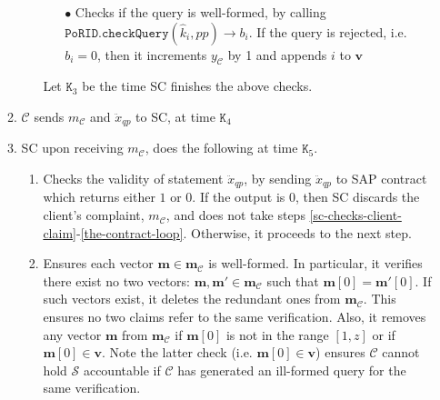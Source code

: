 \begin{enumerate}
\begin{enumerate}
\begin{enumerate}
\begin{itemize}
\item[$\bullet$]Checks if  the query is well-formed, by calling $\mathtt{PoRID.checkQuery}(\hat{k}_{\scriptscriptstyle i}, pp)\rightarrow b_{\scriptscriptstyle i}$. If the query is rejected, i.e. $ b_{\scriptscriptstyle i}=0$, then it increments $y_{\scriptscriptstyle\mathcal C}$ by 1 and appends $i$ to $ {\bm{v}}$
\end{itemize}
Let $\texttt{K}_{\scriptscriptstyle 3}$ be the time SC finishes the above checks.
\end{enumerate}


\item $\mathcal C$  sends $m_{\scriptscriptstyle\mathcal C}$ and $\ddot{x}_{\scriptscriptstyle qp}$ to SC, at time $\texttt{K}_{\scriptscriptstyle 4}$


\item SC upon receiving $m_{\scriptscriptstyle\mathcal C}$, does the following at time $\texttt{K}_{\scriptscriptstyle 5}$. 
\begin{enumerate}
\item Checks the validity of  statement $\ddot{x}_{\scriptscriptstyle qp}$, by   sending $\ddot{x}_{\scriptscriptstyle qp}$ to SAP contract which  returns  either $1$ or $0$. If the output is $0$, then SC discards the client's complaint, ${m}_{\scriptscriptstyle\mathcal C}$, and does not take steps \ref{sc-checks-client-claim}-\ref{the-contract-loop}. Otherwise, it proceeds to the next step. 

 \item\label{sc-checks-client-claim2} Ensures each vector   $ {\bm{m}}\in  {\bm{m}}_{\scriptscriptstyle\mathcal{C}}$ is well-formed. In particular, it verifies there exist no two vectors: $ {\bm{m}}, {\bm{m}}'\in  {\bm{m}}_{\scriptscriptstyle\mathcal{C}}$ such that $ {\bm{m}}[0]= {\bm{m}}'[0]$.  If such vectors  exist, it deletes the redundant ones from $ {\bm{m}}_{\scriptscriptstyle\mathcal{C}}$. This ensures no two claims refer to the same verification.  Also, it removes any vector $ {\bm{m}}$ from $ {\bm{m}}_{\scriptscriptstyle\mathcal{C}}$ if $ {\bm{m}}[0]$ is not in the range $[1,z]$ or if $ {\bm{m}}[0]\in  {\bm{v}}$. Note the latter check  (i.e. $ {\bm{m}}[0]\in  {\bm{v}}$) ensures $\mathcal C$ cannot hold $\mathcal S$ accountable if $\mathcal C$ has generated an ill-formed query for the same verification.   



\end{enumerate}
\end{enumerate}
\end{enumerate}
